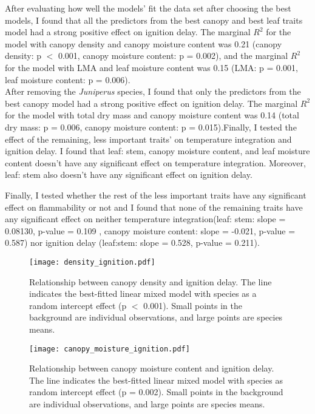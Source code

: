 \documentclass[12pt]{report}
\begin{document}
After evaluating how well the models’ fit the data set after choosing the best models, I found that all the predictors from the best canopy and best leaf traits model had a strong positive effect on ignition delay. The marginal $R^2$ for the model with canopy density and canopy moisture content was 0.21 (canopy density: p $<$ 0.001, canopy moisture content: p = 0.002), and the marginal $R^2$ for the model with LMA and leaf moisture content was 0.15 (LMA: p = 0.001, leaf moisture content: p = 0.006). \\

After removing the \emph{Juniperus} species, I found that only the predictors from the best canopy model had a strong positive effect on ignition delay. The marginal $R^2$ for the model with total dry mass and canopy moisture content was 0.14 (total dry mass: p = 0.006, canopy moisture content: p = 0.015).Finally, I tested the effect of the remaining, less important traits' on temperature integration and ignition delay. I found that leaf: stem, canopy moisture content, and leaf moisture content doesn't have any significant effect on temperature integration. Moreover, leaf: stem also doesn't have any significant effect on ignition delay.

Finally, I tested whether the rest of the less important traits have any significant effect on flammability or not and I found that none of the remaining traits have any significant effect on neither temperature integration(leaf: stem: slope = 0.08130, p-value = 0.109 , canopy moisture content: slope = -0.021,
p-value = 0.587) nor ignition delay (leaf:stem: slope = 0.528, p-value = 0.211).



\begin{figure}
    \centering
    \texttt{[image: density\_ignition.pdf]}
    \caption{Relationship between canopy density and ignition delay. The line indicates the best-fitted linear mixed model with species as a random intercept effect (p $<$ 0.001). Small points in the background are individual observations, and large points are species means.}
\end{figure}

\begin{figure}
    \centering
    \texttt{[image: canopy\_moisture\_ignition.pdf]}
    \caption{Relationship between canopy moisture content and ignition delay. The line indicates the best-fitted linear mixed model with species as random intercept effect (p = 0.002). Small points in the background are individual observations, and large points are species means.}
\end{figure}
\end{document}
